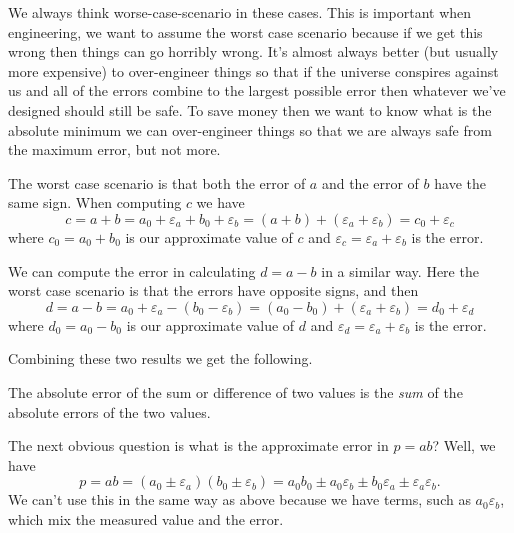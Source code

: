 \documentclass[fleqn]{LectureClass/LectureClass}
\begin{document}
    We always think worse-case-scenario in these cases.
    This is important when engineering, we want to assume the worst case scenario because if we get this wrong then things can go horribly wrong.
    It's almost always better (but usually more expensive) to over-engineer things so that if the universe conspires against us and all of the errors combine to the largest possible error then whatever we've designed should still be safe.
    To save money then we want to know what is the absolute minimum we can over-engineer things so that we are always safe from the maximum error, but not more.
    
    The worst case scenario is that both the error of \(a\) and the error of \(b\) have the same sign.
    When computing \(c\) we have
    \begin{equation}
        c = a + b = a_0 + \varepsilon_a + b_0 + \varepsilon_b = (a + b) + (\varepsilon_a + \varepsilon_b) = c_0 + \varepsilon_c
    \end{equation}
    where \(c_0 = a_0 + b_0\) is our approximate value of \(c\) and \(\varepsilon_c = \varepsilon_a + \varepsilon_b\) is the error.
    
    We can compute the error in calculating \(d = a - b\) in a similar way.
    Here the worst case scenario is that the errors have opposite signs, and then
    \begin{equation}
        d = a - b = a_0 + \varepsilon_a - (b_0 - \varepsilon_b) = (a_0 - b_0) + (\varepsilon_a + \varepsilon_b) = d_0 + \varepsilon_d
    \end{equation}
    where \(d_0 = a_0 - b_0\) is our approximate value of \(d\) and \(\varepsilon_d = \varepsilon_a + \varepsilon_b\) is the error.
    
    Combining these two results we get the following.
    
    \begin{prp}{}{}
        The absolute error of the sum or difference of two values is the \emph{sum} of the absolute errors of the two values.
    \end{prp}
    
    The next obvious question is what is the approximate error in \(p = ab\)?
    Well, we have
    \begin{equation}
        p = ab = (a_0 \pm \varepsilon_a)(b_0 \pm \varepsilon_b) = a_0 b_0 \pm a_0 \varepsilon_b \pm b_0 \varepsilon_a \pm \varepsilon_a \varepsilon_b.
    \end{equation}
    We can't use this in the same way as above because we have terms, such as \(a_0\varepsilon_b\), which mix the measured value and the error.
    
\end{document}
